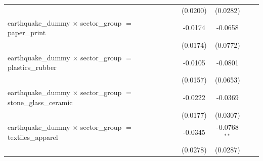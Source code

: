 \begin{tabular}{lcccccccc}
                                                                                  &                       &                       &                       &                       & (0.0200)              & (0.0282)              &                       &   \\   
   earthquake\_dummy $\times$ sector\_group $=$ paper\_print                      &                       &                       &                       &                       & -0.0174               & -0.0658               &                       &   \\   
                                                                                  &                       &                       &                       &                       & (0.0174)              & (0.0772)              &                       &   \\   
   earthquake\_dummy $\times$ sector\_group $=$ plastics\_rubber                  &                       &                       &                       &                       & -0.0105               & -0.0801               &                       &   \\   
                                                                                  &                       &                       &                       &                       & (0.0157)              & (0.0653)              &                       &   \\   
   earthquake\_dummy $\times$ sector\_group $=$ stone\_glass\_ceramic             &                       &                       &                       &                       & -0.0222               & -0.0369               &                       &   \\   
                                                                                  &                       &                       &                       &                       & (0.0177)              & (0.0307)              &                       &   \\   
   earthquake\_dummy $\times$ sector\_group $=$ textiles\_apparel                 &                       &                       &                       &                       & -0.0345               & -0.0768$^{**}$        &                       &   \\   
                                                                                  &                       &                       &                       &                       & (0.0278)              & (0.0287)              &                       &   \\   

\end{tabular}
